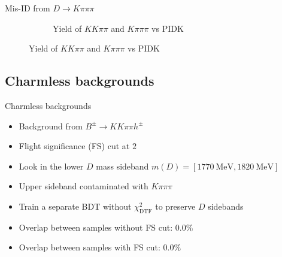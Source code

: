 \documentclass{beamer}
\begin{document}
\begin{frame}{Mis-ID from $D\to K\pi\pi\pi$}
\begin{figure}
\begin{subfigure}{0.5\textwidth}
      \caption{Yield of $KK\pi\pi$ and $K\pi\pi\pi$ vs $\text{PIDK}$}
    \end{subfigure}
  \end{figure}
\end{frame}

\subsection{Charmless backgrounds}
\begin{frame}{Charmless backgrounds}
  \begin{itemize}
    \setlength\itemsep{1.5em}
    \item{Background from $B^\pm\to KK\pi\pi h^\pm$}
    \item{Flight significance (FS) cut at $2$}
    \item{Look in the lower $D$ mass sideband $m(D) = [\SI{1770}{\mega\eV}, \SI{1820}{\mega\eV}]$}
    \item{Upper sideband contaminated with $K\pi\pi\pi$}
    \item{Train a separate BDT without $\chi^2_{\text{DTF}}$ to preserve $D$ sidebands}
    \item{Overlap between samples without FS cut: $0.0\%$}
    \item{Overlap between samples with FS cut: $0.0\%$}
  \end{itemize}
\end{frame}
\end{document}
